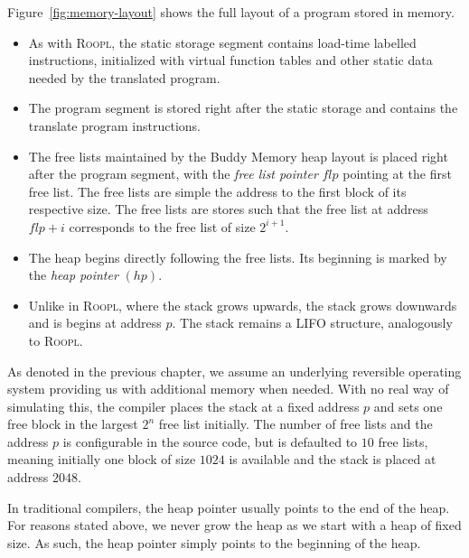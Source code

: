 Figure~\ref{fig:memory-layout} shows the full layout of a \rooplpp program stored in memory.

\begin{itemize}
    \item As with \textsc{Roopl}, the static storage segment contains load-time labelled  instructions, initialized with virtual function tables and other static data needed by the translated program.

    \item The program segment is stored right after the static storage and contains the translate \rooplpp program instructions.

    \item The free lists maintained by the Buddy Memory heap layout is placed right after the program segment, with the \textit{free list pointer} $flp$ pointing at the first free list. The free lists are simple the address to the first block of its respective size. The free lists are stores such that the free list at address $flp + i$ corresponds to the free list of size $2^{i+1}$.   

    \item The heap begins directly following the free lists. Its beginning is marked by the \textit{heap pointer} $(hp)$. 

    \item Unlike in \textsc{Roopl}, where the stack grows upwards, the \rooplpp stack grows downwards and is begins at address $p$. The stack remains a LIFO structure, analogously to \textsc{Roopl}.
\end{itemize}

As denoted in the previous chapter, we assume an underlying reversible operating system providing us with additional memory when needed. With no real way of simulating this, the \rooplpp compiler places the stack at a fixed address $p$ and sets one free block in the largest $2^n$ free list initially. The number of free lists and the address $p$ is configurable in the source code, but is defaulted to $10$ free lists, meaning initially one block of size $1024$ is available and the stack is placed at address $2048$.

In traditional compilers, the heap pointer usually points to the end of the heap. For reasons stated above, we never grow the heap as we start with a heap of fixed size. As such, the heap pointer simply points to the beginning of the heap.

